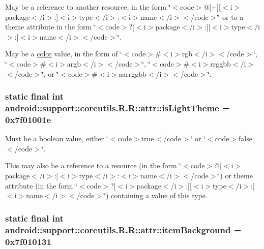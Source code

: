 May be a reference to another resource, in the form \char`\"{}$<$code$>$@\mbox{[}+\mbox{]}\mbox{[}$<$i$>$package$<$/i$>$:\mbox{]}$<$i$>$type$<$/i$>$:$<$i$>$name$<$/i$>$$<$/code$>$\char`\"{} or to a theme attribute in the form \char`\"{}$<$code$>$?\mbox{[}$<$i$>$package$<$/i$>$:\mbox{]}\mbox{[}$<$i$>$type$<$/i$>$:\mbox{]}$<$i$>$name$<$/i$>$$<$/code$>$\char`\"{}. 

May be a \hyperlink{classandroid_1_1support_1_1coreutils_1_1_r_1_1color}{color} value, in the form of \char`\"{}$<$code$>$\#$<$i$>$rgb$<$/i$>$$<$/code$>$\char`\"{}, \char`\"{}$<$code$>$\#$<$i$>$argb$<$/i$>$$<$/code$>$\char`\"{}, \char`\"{}$<$code$>$\#$<$i$>$rrggbb$<$/i$>$$<$/code$>$\char`\"{}, or \char`\"{}$<$code$>$\#$<$i$>$aarrggbb$<$/i$>$$<$/code$>$\char`\"{}. \hypertarget{classandroid_1_1support_1_1coreutils_1_1_r_1_1attr_bf1d95df0b461a6b964cdf1115d4d59f}{
\subsubsection[{isLightTheme}]{\setlength{\rightskip}{0pt plus 5cm}static final int android::support::coreutils.R.R::attr::isLightTheme = 0x7f01001e}}
\label{classandroid_1_1support_1_1coreutils_1_1_r_1_1attr_bf1d95df0b461a6b964cdf1115d4d59f}


Must be a boolean value, either \char`\"{}$<$code$>$true$<$/code$>$\char`\"{} or \char`\"{}$<$code$>$false$<$/code$>$\char`\"{}. 

This may also be a reference to a resource (in the form \char`\"{}$<$code$>$@\mbox{[}$<$i$>$package$<$/i$>$:\mbox{]}$<$i$>$type$<$/i$>$:$<$i$>$name$<$/i$>$$<$/code$>$\char`\"{}) or theme attribute (in the form \char`\"{}$<$code$>$?\mbox{[}$<$i$>$package$<$/i$>$:\mbox{]}\mbox{[}$<$i$>$type$<$/i$>$:\mbox{]}$<$i$>$name$<$/i$>$$<$/code$>$\char`\"{}) containing a value of this type. \hypertarget{classandroid_1_1support_1_1coreutils_1_1_r_1_1attr_83b206fbc7969ad15b2379937c984b4b}{
\subsubsection[{itemBackground}]{\setlength{\rightskip}{0pt plus 5cm}static final int android::support::coreutils.R.R::attr::itemBackground = 0x7f010131}}
\label{classandroid_1_1support_1_1coreutils_1_1_r_1_1attr_83b206fbc7969ad15b2379937c984b4b}


